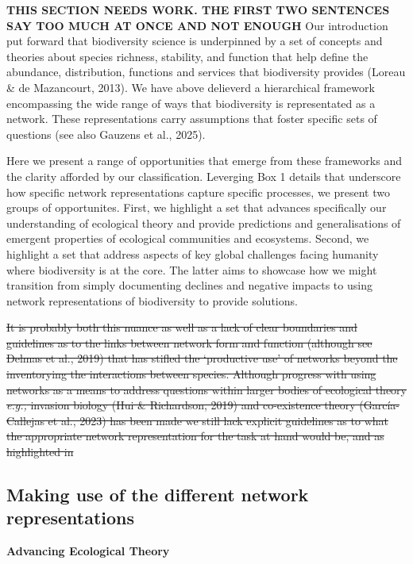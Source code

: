 \documentclass[
]{article}
\begin{document}
\textbf{THIS SECTION NEEDS WORK. THE FIRST TWO SENTENCES SAY TOO MUCH AT
ONCE AND NOT ENOUGH} Our introduction put forward that biodiversity
science is underpinned by a set of concepts and theories about species
richness, stability, and function that help define the abundance,
distribution, functions and services that biodiversity provides (Loreau
\& de Mazancourt, 2013). We have above delieverd a hierarchical
framework encompassing the wide range of ways that biodiversity is
representated as a network. These representations carry assumptions that
foster specific sets of questions (see also Gauzens et al., 2025).

Here we present a range of opportunities that emerge from these
frameworks and the clarity afforded by our classification. Leverging Box
1 details that underscore how specific network representations capture
specific processes, we present two groups of opportunites. First, we
highlight a set that advances specifically our understanding of
ecological theory and provide predictions and generalisations of
emergent properties of ecological communities and ecosystems. Second, we
highlight a set that address aspects of key global challenges facing
humanity where biodiversity is at the core. The latter aims to showcase
how we might transition from simply documenting declines and negative
impacts to using network representations of biodiversity to provide
solutions.

\st{It is probably both this nuance as well as a lack of clear
boundaries and guidelines as to the links between network form and
function (although see Delmas et al., 2019) that has stifled the
`productive use' of networks beyond the inventorying the interactions
between species. Although progress with using networks as a means to
address questions within larger bodies of ecological theory \emph{e.g.,}
invasion biology (Hui \& Richardson, 2019) and co-existence theory
(García-Callejas et al., 2023) has been made we still lack explicit
guidelines as to what the appropriate network representation for the
task at hand would be, and as highlighted in}

\subsection{Making use of the different network
representations}\label{making-use-of-the-different-network-representations}

\textbf{Advancing Ecological Theory}
\end{document}

